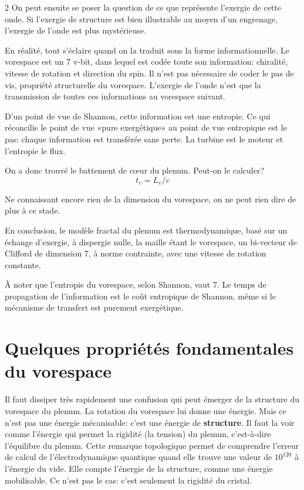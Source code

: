\begin{multicols}{2}
On peut ensuite se poser la question de ce que représente l'exergie de
cette onde. Si l'exergie de structure est bien illustrable au moyen d'un
engrenage, l'exergie de l'onde est plus mystérieuse.

En réalité, tout s'éclaire quand on la traduit sous la forme
informationnelle. Le vorespace est un 7 v-bit, dans lequel est codée
toute son information: chiralité, vitesse de rotation et direction du
spin. Il n'est pas nécessaire de coder le pas de vis, propriété
structurelle du vorespace. L'exergie de l'onde n'est que la transmission
de toutes ces informations au vorespace suivant.

D'un point de vue de Shannon, cette information est une entropie. Ce
qui réconcilie le point de vue «pure exergétique» au point de vue
entropique est le pas: chaque information est transférée sans perte.
La turbine est le moteur et l'entropie le flux.
\medskip

On a donc trouvé le battement de cœur du plenum. Peut-on le calculer?
\begin{equation*}
	t_v = L_v / c
\end{equation*}

Ne connaissant encore rien de la dimension du vorespace, on ne peut
rien dire de plus à ce stade.
\medskip

En conclusion, le modèle fractal du plenum est thermodynamique, basé
sur un échange d'exergie, à dispergie nulle, la maille étant le
vorespace, un bi-vecteur de Clifford de dimension 7, à norme contrainte,
avec une vitesse de rotation constante.

À noter que l'entropie du vorespace, selon Shannon, vaut 7. Le temps
de propagation de l'information est le coût entropique de Shannon, même
si le mécanisme de transfert est purement exergétique.

\section{Quelques propriétés fondamentales du vorespace}
	
Il faut dissiper très rapidement une confusion qui peut émerger de la
structure du vorespace du plenum. La rotation du vorespace lui donne
une énergie. Mais ce n'est pas une énergie mécanisable: c'est une
énergie de \textbf{structure}. Il faut la voir comme l'énergie qui permet la
rigidité (la tension) du plenum, c'est-à-dire l'équilibre du plenum.
Cette remarque topologique permet de comprendre l'erreur de calcul de
l'électrodynamique quantique quand elle trouve une valeur de $10^{120}$ à
l'énergie du vide. Elle compte l'énergie de la structure, comme une
énergie mobilisable. Ce n'est pas le cas: c'est seulement la rigidité
du cristal.


\end{multicols}
